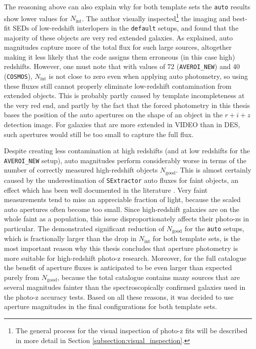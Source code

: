 The reasoning above can also explain why for both template sets the \texttt{auto} results show lower values for $N_{\mathrm{int}}$. The author visually inspected\footnote{The general process for the visual inspection of photo-z fits will be described in more detail in Section \ref{subsection:visual_inspection}.} the imaging and best-fit SEDs  of low-redshift interlopers in the \texttt{default} setups, and found that the majority of these objects are very red extended galaxies. As explained, auto magnitudes capture more of the total flux for such large sources, altogether making it less likely that the code assigns them erroneous (in this case high) redshifts. However, one must note that with values of 72 (\texttt{AVEROI\_NEW}) and 40 (\texttt{COSMOS}), $N_{\mathrm{int}}$ is not close to zero even when applying auto photometry, so using these fluxes still cannot properly eliminate low-redshift contamination from extended objects. This is probably partly caused by template incompleteness at the very red end, and partly by the fact that the forced photometry in this thesis bases the position of the auto apertures on the shape of an object in the $r+i+z$ detection image. For galaxies that are more extended in VIDEO than in DES, such apertures would still be too small to capture the full flux. \par


Despite creating less contamination at high redshifts (and at low redshifts for the \texttt{AVEROI\_NEW} setup), auto magnitudes perform considerably worse in terms of the number of correctly measured high-redshift objects $N_{\mathrm{good}}$. This is almost certainly caused by the underestimation of \texttt{SExtractor} auto fluxes for faint objects, an effect which has been well documented in the literature \citep{2003AJ....125.1107L,2007AJ....134.1103Q}. Very faint measurements tend to miss an appreciable fraction of light, because the scaled auto apertures often become too small. Since high-redshift galaxies are on the whole faint as a population, this issue disproportionately affects their photo-zs in particular. The demonstrated significant reduction of $N_{\mathrm{good}}$ for the \texttt{auto} setups, which is fractionally larger than the drop in $N_{\mathrm{int}}$ for both template sets, is the most important reason why this thesis concludes that aperture photometry is more suitable for high-redshift photo-z research. Moreover, for the full \DESVIDEO catalogue the benefit of aperture fluxes is anticipated to be even larger than expected purely from $N_{\mathrm{good}}$, because the total catalogue contains many sources that are several magnitudes fainter than the spectroscopically confirmed galaxies used in the photo-z accuracy tests. Based on all these reasons, it was decided to use aperture magnitudes in the final configurations for both template sets.\par

